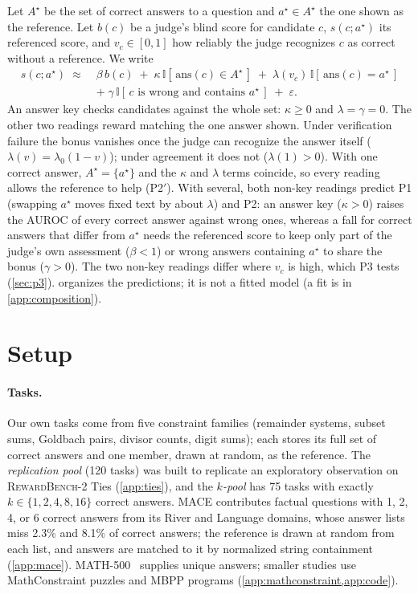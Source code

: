 \documentclass{article}
\begin{document}
Let $A^\star$ be the set of correct answers to a question and $a^\star \in A^\star$ the one shown as the reference. Let $b(c)$ be a judge's blind score for candidate $c$, $s(c; a^\star)$ its referenced score, and $v_c \in [0, 1]$ how reliably the judge recognizes $c$ as correct without a reference. We write
\begin{equation}
\begin{aligned}
s(c; a^\star) \;\approx\;& \beta\, b(c) \;+\; \kappa\, \mathbb{I}[\,\mathrm{ans}(c) \in A^\star\,] \;+\; \lambda(v_c)\, \mathbb{I}[\,\mathrm{ans}(c) = a^\star\,] \\
&+\; \gamma\, \mathbb{I}[\,c \text{ is wrong and contains } a^\star\,] \;+\; \varepsilon .
\end{aligned}
\label{eq:model}
\end{equation}
An answer key checks candidates against the whole set: $\kappa \ge 0$ and $\lambda = \gamma = 0$. The other two readings reward matching the one answer shown. Under verification failure the bonus vanishes once the judge can recognize the answer itself ($\lambda(v) = \lambda_0(1-v)$); under agreement it does not ($\lambda(1) > 0$).
With one correct answer, $A^\star = \{a^\star\}$ and the $\kappa$ and $\lambda$ terms coincide, so every reading allows the reference to help (P2$'$).
With several, both non-key readings predict P1 (swapping $a^\star$ moves fixed text by about $\lambda$) and P2: an answer key ($\kappa > 0$) raises the AUROC of every correct answer against wrong ones, whereas a fall for correct answers that differ from $a^\star$ needs the referenced score to keep only part of the judge's own assessment ($\beta < 1$) or wrong answers containing $a^\star$ to share the bonus ($\gamma > 0$).
The two non-key readings differ where $v_c$ is high, which P3 tests (\cref{sec:p3}).
 organizes the predictions; it is not a fitted model (a fit is in \cref{app:composition}).

\section{Setup}
\label{sec:setup}

\paragraph{Tasks.}
Our own tasks come from five constraint families (remainder systems, subset sums, Goldbach pairs, divisor counts, digit sums); each stores its full set of correct answers and one member, drawn at random, as the reference.
The \emph{replication pool} (120 tasks) was built to replicate an exploratory observation on \textsc{RewardBench-2} Ties (\cref{app:ties}), and the \emph{$k$-pool} has 75 tasks with exactly $k \in \{1,2,4,8,16\}$ correct answers.
\textsc{MACE} contributes factual questions with 1, 2, 4, or 6 correct answers from its River and Language domains, whose answer lists miss 2.3\% and 8.1\% of correct answers; the reference is drawn at random from each list, and answers are matched to it by normalized string containment (\cref{app:mace}). MATH-500~\citep{hendrycks2021math} supplies unique answers; smaller studies use MathConstraint puzzles and MBPP programs (\cref{app:mathconstraint,app:code}).
\end{document}
